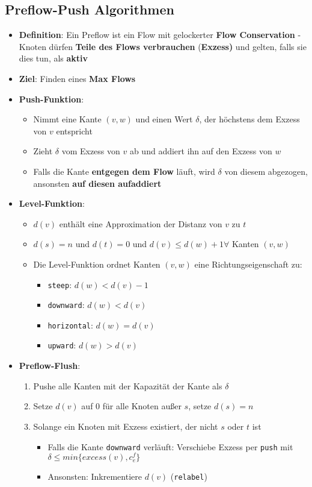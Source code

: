 \newpage
\subsection{Preflow-Push Algorithmen}%
\label{mfm:sub:preflow_push_algorithmen}

\begin{itemize}
	\item \textbf{Definition}: Ein Preflow ist ein Flow mit gelockerter \textbf{Flow Conservation} - Knoten dürfen \textbf{Teile des Flows verbrauchen} (\textbf{Exzess)} und gelten, falls sie dies tun, als \textbf{aktiv}
	\item \textbf{Ziel}: Finden eines \textbf{Max Flows}
	\item \textbf{Push-Funktion}: 
	\begin{itemize}
		\item Nimmt eine Kante $(v,w)$ und einen Wert $\delta$, der höchstens dem Exzess von $v$ entspricht
		\item Zieht $\delta$ vom Exzess von $v$ ab und addiert ihn auf den Exzess von $w$
		\item Falls die Kante \textbf{entgegen dem Flow} läuft, wird $\delta$ von diesem abgezogen, ansonsten \textbf{auf diesen aufaddiert}
	\end{itemize}
	\item \textbf{Level-Funktion}:
	\begin{itemize}
		\item $d(v)$ enthält eine Approximation der Distanz von $v$ zu $t$
		\item $d(s) = n$ und $d(t) = 0$ und $d(v) \leq d(w) + 1 \forall$ Kanten $(v,w)$
		\item Die Level-Funktion ordnet Kanten $(v,w)$ eine Richtungseigenschaft zu:
		\begin{itemize}
			\item \texttt{steep}: $d(w) < d(v) - 1$
			\item \texttt{downward}: $d(w) < d(v)$
			\item \texttt{horizontal}: $d(w) = d(v)$
			\item \texttt{upward}: $d(w) > d(v)$
		\end{itemize}
	\end{itemize}
	\item \textbf{Preflow-Flush}:
	\begin{enumerate}
		\item Pushe alle Kanten mit der Kapazität der Kante als $\delta$
		\item Setze $d(v)$ auf $0$ für alle Knoten außer $s$, setze $d(s) = n$
		\item Solange ein Knoten mit Exzess existiert, der nicht $s$ oder $t$ ist
		\begin{itemize}
			\item Falls die Kante \texttt{downward} verläuft: Verschiebe Exzess per \texttt{push} mit $\delta \leq min\{excess(v), c_e^f\}$
			\item Ansonsten: Inkrementiere $d(v)$ (\texttt{relabel})
		\end{itemize}
	\end{enumerate}
\end{itemize}